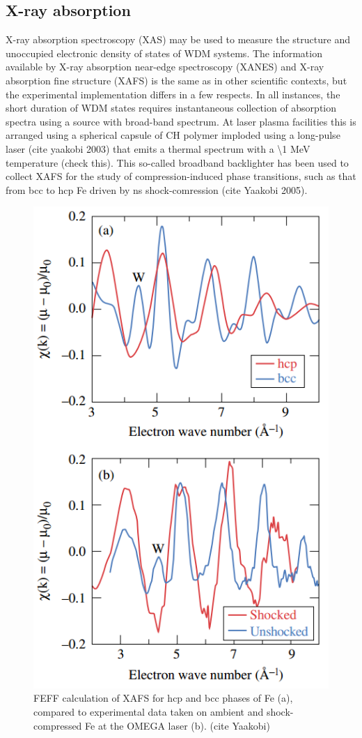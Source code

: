 \subsection{X-ray absorption}
X-ray absorption spectroscopy (XAS) may be used to measure the structure and unoccupied electronic density of states of WDM systems. The information available by X-ray absorption near-edge spectroscopy (XANES) and X-ray absorption fine structure (XAFS) is the same as in other scientific contexts, but the experimental implementation differs in a few respects. In all instances, the short duration of WDM states requires instantaneous collection of absorption spectra using a source with broad-band spectrum. At laser plasma facilities this is arranged using a spherical capsule of CH polymer imploded using a long-pulse laser (cite yaakobi 2003) that emits a thermal spectrum with a \textbackslash 1 MeV temperature (check this). This so-called broadband backlighter has been used to collect XAFS for the study of compression-induced phase transitions, such as that from bcc to hcp Fe driven by ns shock-comression (cite Yaakobi 2005).

\begin{figure}[h] \label{fig:xafs}
\caption{FEFF calculation of XAFS for hcp and bcc phases of Fe (a), compared to experimental data taken on ambient and shock-compressed Fe at the OMEGA laser (b). (cite Yaakobi)}
\centering
\includegraphics[scale=0.6]{../Figures/yaakobi_shock_xafs.png}
\end{figure}

